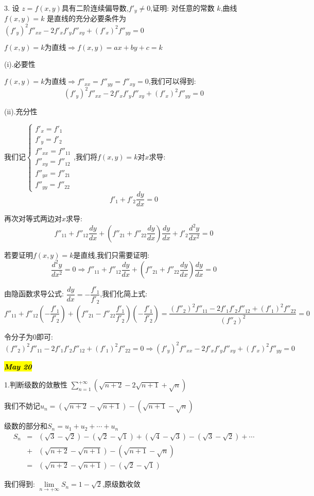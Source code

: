 3. 设 $z=f(x,y)$具有二阶连续偏导数,$f'_{y}\neq 0$,证明: 对任意的常数 $k$,曲线$f(x,y)=k$ 是直线的充分必要条件为$(f'_{y})^2f''_{xx}-2f'_{x}f'_{y}f''_{xy}+(f'_{x})^2f''_{yy}=0$
\begin{solution}
	
	$f(x,y)=k\text{为直线}\Rightarrow f(x,y)=ax+by+c=k$
	
	(i).必要性
	
	$f(x,y)=k\text{为直线}\Rightarrow f''_{xx}=f''_{yy}=f''_{xy}=0$,我们可以得到: $$(f'_{y})^2f''_{xx}-2f'_{x}f'_{y}f''_{xy}+(f'_{x})^2f''_{yy}=0$$
	
	(ii).充分性
	
	我们记$\left\lbrace 
	\begin{array}{l}
		f'_{x}=f'_{1}\\
		f'_{y}=f'_{2}\\
		f''_{xx}=f''_{11}\\
		f''_{xy}=f''_{12}\\
		f''_{yx}=f''_{21}\\
		f''_{yy}=f''_{22}
	\end{array}
	\right. $,我们将$f(x,y)=k$对$x$求导: 
	$$f'_{1}+f'_{2}\frac{dy}{dx}=0$$
	
	再次对等式两边对$x$求导: 
	$$f''_{11}+f''_{12}\frac{dy}{dx}+(f''_{21}+f''_{22}\frac{dy}{dx})\frac{dy}{dx}+f'_{2}\frac{d^2y}{dx^2}=0$$
	
	若要证明$f(x,y)=k$是直线,我们只需要证明: 
	$$\frac{d^2y}{dx^2}=0\Rightarrow f''_{11}+f''_{12}\frac{dy}{dx}+(f''_{21}+f''_{22}\frac{dy}{dx})\frac{dy}{dx}=0$$
	
	由隐函数求导公式: $\dfrac{dy}{dx}=-\dfrac{f'_{1}}{f'_{2}}$,我们化简上式: 
	$$f''_{11}+f''_{12}(-\frac{f'_{1}}{f'_{2}})+(f''_{21}-f''_{22}\frac{f'_{1}}{f'_{2}})(-\frac{f'_{1}}{f'_{2}})=\frac{(f''_{2})^2f''_{11}-2f'_{1}f'_{2}f''_{12}+(f'_{1})^2f''_{22}}{(f''_{2})^2}=0$$
	
	令分子为$0$即可: 
	$$(f''_{2})^2f''_{11}-2f'_{1}f'_{2}f''_{12}+(f'_{1})^2f''_{22}=0\Rightarrow(f'_{y})^2f''_{xx}-2f'_{x}f'_{y}f''_{xy}+(f'_{x})^2f''_{yy}=0$$
\end{solution}


\hl{\textbf{\textit{May 20}}}

1.判断级数的敛散性 $\sum\limits_{n=1}^{+\infty}(\sqrt{n+2}-2\sqrt{n+1}+\sqrt{n})$
\begin{solution}
	
	我们不妨记$u_{n}=(\sqrt{n+2}-\sqrt{n+1})-(\sqrt{n+1}-\sqrt{n})$
	
	级数的部分和$S_{n}=u_{1}+u_{2}+\cdots+u_{n}$
	\begin{eqnarray*}
		S_{n}&=&(\sqrt{3}-\sqrt{2})-(\sqrt{2}-\sqrt{1})+(\sqrt{4}-\sqrt{3})-(\sqrt{3}-\sqrt{2})+\cdots\\
		&+&(\sqrt{n+2}-\sqrt{n+1})-(\sqrt{n+1}-\sqrt{n})\\
		&=&(\sqrt{n+2}-\sqrt{n+1})-(\sqrt{2}-\sqrt{1})
	\end{eqnarray*}
	
	我们得到: $\lim\limits_{n\rightarrow +\infty}S_{n}=1-\sqrt{2}$,原级数收敛
\end{solution}

